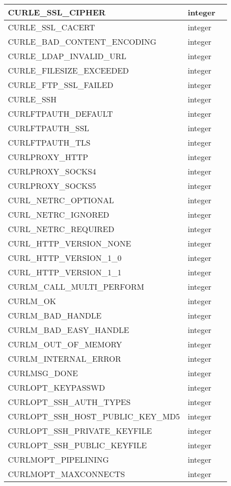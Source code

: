 \begin{longtable}{|m{150pt}|m{40pt}|m{200pt}|}
\hline
CURLE\_SSL\_CIPHER&integer&\\
\hline
CURLE\_SSL\_CACERT&integer&\\
\hline
CURLE\_BAD\_CONTENT\_ENCODING&integer&\\
\hline
CURLE\_LDAP\_INVALID\_URL&integer&\\
\hline
CURLE\_FILESIZE\_EXCEEDED&integer&\\
\hline
CURLE\_FTP\_SSL\_FAILED&integer&\\
\hline
CURLE\_SSH&integer&\\
\hline
CURLFTPAUTH\_DEFAULT&integer&\\
\hline
CURLFTPAUTH\_SSL&integer&\\
\hline
CURLFTPAUTH\_TLS&integer&\\
\hline
CURLPROXY\_HTTP&integer&\\
\hline
CURLPROXY\_SOCKS4&integer&\\
\hline
CURLPROXY\_SOCKS5&integer&\\
\hline
CURL\_NETRC\_OPTIONAL&integer&\\
\hline
CURL\_NETRC\_IGNORED&integer&\\
\hline
CURL\_NETRC\_REQUIRED&integer&\\
\hline
CURL\_HTTP\_VERSION\_NONE&integer&\\
\hline
CURL\_HTTP\_VERSION\_1\_0&integer&\\
\hline
CURL\_HTTP\_VERSION\_1\_1&integer&\\
\hline
CURLM\_CALL\_MULTI\_PERFORM&integer&\\
\hline
CURLM\_OK&integer&\\
\hline
CURLM\_BAD\_HANDLE&integer&\\
\hline
CURLM\_BAD\_EASY\_HANDLE&integer&\\
\hline
CURLM\_OUT\_OF\_MEMORY&integer&\\
\hline
CURLM\_INTERNAL\_ERROR&integer&\\
\hline
CURLMSG\_DONE&integer&\\
\hline
CURLOPT\_KEYPASSWD&integer&\\
\hline
CURLOPT\_SSH\_AUTH\_TYPES&integer&\\
\hline
CURLOPT\_SSH\_HOST\_PUBLIC\_KEY\_MD5&integer&\\
\hline
CURLOPT\_SSH\_PRIVATE\_KEYFILE&integer&\\
\hline
CURLOPT\_SSH\_PUBLIC\_KEYFILE&integer&\\
\hline
CURLMOPT\_PIPELINING&integer&\\
\hline
CURLMOPT\_MAXCONNECTS&integer&\\

\end{longtable}
